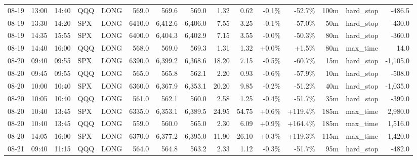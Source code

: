 \documentclass[11pt,a4paper,twoside]{article}
\begin{document}
\begin{landscape}
\begin{center}
\begin{longtable}{>{\color{txtmain}}l l l l l r r r r r r r r >{\color{txtmain}}l r}
08-19 & 13:00 & 14:40 & QQQ & LONG & 569.0 & 569.6 & 569.0 & 1.32 & 0.62 & \textcolor{lossred}{-0.1\%} & \textcolor{lossred}{-52.7\%} & 100m & hard\_stop & \textcolor{lossred}{-486.5} \\
08-19 & 13:30 & 14:20 & SPX & LONG & 6410.0 & 6,412.6 & 6,406.0 & 7.55 & 3.25 & \textcolor{lossred}{-0.1\%} & \textcolor{lossred}{-57.0\%} & 50m & hard\_stop & \textcolor{lossred}{-430.0} \\
08-19 & 14:35 & 15:55 & SPX & LONG & 6400.0 & 6,404.3 & 6,402.9 & 7.15 & 3.55 & \textcolor{lossred}{-0.0\%} & \textcolor{lossred}{-50.3\%} & 80m & hard\_stop & \textcolor{lossred}{-360.0} \\
08-19 & 14:40 & 16:00 & QQQ & LONG & 568.0 & 569.0 & 569.3 & 1.31 & 1.32 & \textcolor{wingreen}{+0.0\%} & \textcolor{wingreen}{+1.5\%} & 80m & max\_time & \textcolor{wingreen}{14.0} \\
08-20 & 09:40 & 09:55 & SPX & LONG & 6390.0 & 6,399.2 & 6,368.6 & 18.20 & 7.15 & \textcolor{lossred}{-0.5\%} & \textcolor{lossred}{-60.7\%} & 15m & hard\_stop & \textcolor{lossred}{-1,105.0} \\
08-20 & 09:45 & 09:55 & QQQ & LONG & 565.0 & 565.8 & 562.1 & 2.20 & 0.93 & \textcolor{lossred}{-0.6\%} & \textcolor{lossred}{-57.9\%} & 10m & hard\_stop & \textcolor{lossred}{-508.0} \\
08-20 & 10:00 & 10:40 & SPX & LONG & 6360.0 & 6,367.9 & 6,353.1 & 20.20 & 9.85 & \textcolor{lossred}{-0.2\%} & \textcolor{lossred}{-51.2\%} & 40m & hard\_stop & \textcolor{lossred}{-1,035.0} \\
08-20 & 10:05 & 10:40 & QQQ & LONG & 561.0 & 562.1 & 560.0 & 2.58 & 1.25 & \textcolor{lossred}{-0.4\%} & \textcolor{lossred}{-51.7\%} & 35m & hard\_stop & \textcolor{lossred}{-399.0} \\
08-20 & 10:40 & 13:45 & SPX & LONG & 6335.0 & 6,353.1 & 6,389.5 & 24.95 & 54.75 & \textcolor{wingreen}{+0.6\%} & \textcolor{wingreen}{+119.4\%} & 185m & max\_time & \textcolor{wingreen}{2,980.0} \\
08-20 & 10:40 & 13:45 & QQQ & LONG & 559.0 & 560.0 & 565.0 & 2.30 & 6.09 & \textcolor{wingreen}{+0.9\%} & \textcolor{wingreen}{+164.4\%} & 185m & max\_time & \textcolor{wingreen}{1,516.0} \\
08-20 & 14:05 & 16:00 & SPX & LONG & 6370.0 & 6,377.2 & 6,395.0 & 11.90 & 26.10 & \textcolor{wingreen}{+0.3\%} & \textcolor{wingreen}{+119.3\%} & 115m & max\_time & \textcolor{wingreen}{1,420.0} \\
08-21 & 09:40 & 11:15 & QQQ & LONG & 564.0 & 564.8 & 563.2 & 2.33 & 1.12 & \textcolor{lossred}{-0.3\%} & \textcolor{lossred}{-51.7\%} & 95m & hard\_stop & \textcolor{lossred}{-482.0} \\

\end{longtable}
\end{center}
\end{landscape}
\end{document}
